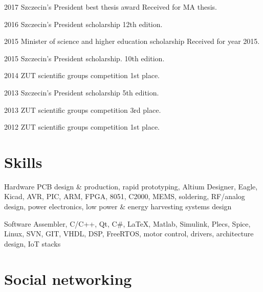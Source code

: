 \documentclass{tccv}
\begin{document}
\begin{yearlist}

\item{2017}
     {Szczecin's President best thesis award}
     {Received for MA thesis.} 

\item{2016}
     {Szczecin's President scholarship}
     {12th edition.} 
     
\item{2015}
     {Minister of science and higher education scholarship}
     {Received for year 2015.} 

\item{2015}
     {Szczecin's President scholarship.}
     {10th edition.} 

\item{2014}
     {ZUT scientific groups competition}
     {1st place.}
     
\item{2013}
     {Szczecin's President scholarship}
     {5th edition.} 

\item{2013}
     {ZUT scientific groups competition}
     {3rd place.}

\item{2012}
     {ZUT scientific groups competition}
     {1st place.}
    
\end{yearlist}

\section{Skills}

\begin{factlist}

\item{Hardware}
     {PCB design \& production, rapid prototyping, Altium Designer, Eagle, Kicad, AVR, PIC, ARM, FPGA, 8051, C2000, MEMS, soldering, RF/analog design, power electronics, low power \& energy harvesting systems design}

\item{Software}
     {Assembler, C/C++, Qt, C\#, \LaTeX, Matlab, Simulink, Plecs, Spice, Linux, SVN, GIT, VHDL, DSP, FreeRTOS, motor control, drivers, architecture design, IoT stacks}

\end{factlist}

\section{Social networking}
\end{document}
